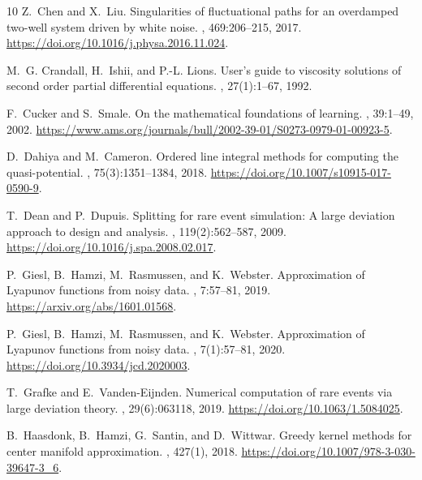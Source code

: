 \begin{thebibliography}{10}
Z.~Chen and X.~Liu.
\newblock Singularities of fluctuational paths for an overdamped two-well
  system driven by white noise.
,
  469:206--215, 2017.
\newblock \url{https://doi.org/10.1016/j.physa.2016.11.024}.

\begingroup\color{blue}
M.~G. Crandall, H.~Ishii, and P.-L. Lions.
\newblock User's guide to viscosity solutions of second order partial
  differential equations.
, 27(1):1--67,
  1992.
\par\endgroup

F.~Cucker and S.~Smale.
\newblock On the mathematical foundations of learning.
, 39:1--49, 2002.
\newblock
  \url{https://www.ams.org/journals/bull/2002-39-01/S0273-0979-01-00923-5}.

D.~Dahiya and M.~Cameron.
\newblock Ordered line integral methods for computing the quasi-potential.
, 75(3):1351--1384, 2018.
\newblock \url{https://doi.org/10.1007/s10915-017-0590-9}.

T.~Dean and P.~Dupuis.
\newblock Splitting for rare event simulation: A large deviation approach to
  design and analysis.
, 119(2):562--587,
  2009.
\newblock \url{https://doi.org/10.1016/j.spa.2008.02.017}.

P.~Giesl, B.~Hamzi, M.~Rasmussen, and K.~Webster.
\newblock Approximation of {L}yapunov functions from noisy data.
, 7:57--81, 2019.
\newblock \url{https://arxiv.org/abs/1601.01568}.

P.~Giesl, B.~Hamzi, M.~Rasmussen, and K.~Webster.
\newblock Approximation of {L}yapunov functions from noisy data.
, 7(1):57--81, 2020.
\newblock \url{https://doi.org/10.3934/jcd.2020003}.

T.~Grafke and E.~Vanden-Eijnden.
\newblock Numerical computation of rare events via large deviation theory.
, 29(6):063118, 2019.
\newblock \url{https://doi.org/10.1063/1.5084025}.

B.~Haasdonk, B.~Hamzi, G.~Santin, and D.~Wittwar.
\newblock Greedy kernel methods for center manifold approximation.
, 427(1), 2018.
\newblock \url{https://doi.org/10.1007/978-3-030-39647-3_6}.


\end{thebibliography}
